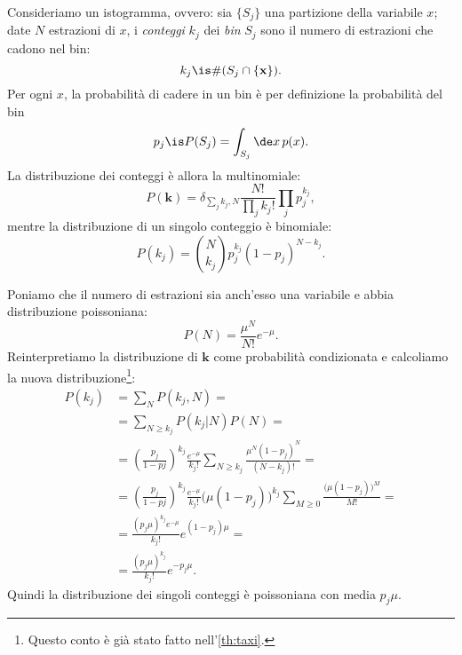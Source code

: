 
Consideriamo un istogramma, ovvero:
sia $\{S_j\}$ una partizione della variabile $x$;
date $N$ estrazioni di $x$, i \emph{conteggi} $k_j$ dei \emph{bin} $S_j$
sono il numero di estrazioni che cadono nel bin:
\begin{equation*}
	k_j \is \# (S_j \cap \{\mathbf x\}).
\end{equation*}
Per ogni $x$, la probabilità di cadere in un bin è per definizione la probabilità del bin
\begin{equation*}
	p_j \is P(S_j) = \int_{S_j} \de x\,p(x).
\end{equation*}
La distribuzione dei conteggi è allora la multinomiale:
\begin{equation*}
	P(\mathbf k)
	= \delta_{\sum_jk_j,N} \frac{N!}{\prod_jk_j!}\prod_j p_j^{k_j},
\end{equation*}
mentre la distribuzione di un singolo conteggio è binomiale:
\begin{equation*}
	P(k_j) = \binom N{k_j} p_j^{k_j} (1-p_j)^{N-k_j}.
\end{equation*}

Poniamo che il numero di estrazioni sia anch'esso una variabile e abbia distribuzione poissoniana:
\begin{equation*}
	P(N)
	= \frac{\mu^N}{N!}e^{-\mu}.
\end{equation*}
Reinterpretiamo la distribuzione di $\mathbf k$ come probabilità condizionata e calcoliamo la nuova distribuzione\footnote{Questo conto è già stato fatto nell'\autoref{th:taxi}.}:
\begin{align*}
	P(k_j)
	&= \sum_N P(k_j,N) = \\
	&= \sum_{N\ge k_j} P(k_j|N) P(N) = \\
	&= \left(\frac{p_j}{1-pj}\right)^{k_j} \frac{e^{-\mu}}{k_j!}
	\sum_{N\ge k_j} \frac{\mu^N (1-p_j)^N}{(N-k_j)!} = \\
	&= \left(\frac{p_j}{1-pj}\right)^{k_j} \frac{e^{-\mu}}{k_j!}
	\big(\mu(1-p_j)\big)^{k_j} \sum_{M\ge 0} \frac{\big(\mu(1-p_j)\big)^M}{M!} = \\
	&= \frac{(p_j\mu)^{k_j} e^{-\mu}}{k_j!} e^{(1-p_j)\mu} = \\
	&= \frac{(p_j\mu)^{k_j}}{k_j!} e^{-p_j\mu}.
\end{align*}
Quindi la distribuzione dei singoli conteggi è poissoniana con media $p_j\mu$.

